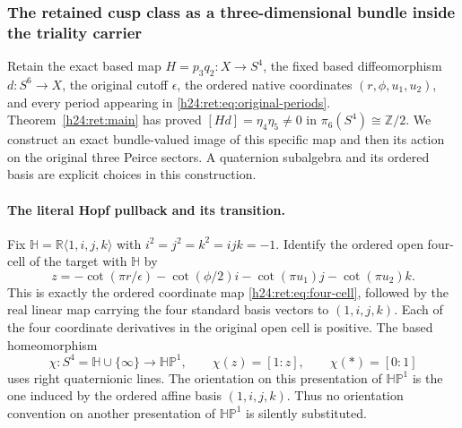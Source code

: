 
\subsubsection{The retained cusp class as a three-dimensional bundle inside the triality carrier}
\label{h24:rettri:section}

Retain the exact based map $H=p_3q_2:X\to S^4$, the fixed based
diffeomorphism $d:S^6\to X$, the original cutoff $\epsilon$, the ordered
native coordinates $(r,\phi,u_1,u_2)$, and every period appearing in
\eqref{h24:ret:eq:original-periods}. Theorem~\ref{h24:ret:main} has proved
$[H d]=\eta_4\eta_5\ne0$ in $\pi_6(S^4)\cong\mathbb Z/2$.
We construct an exact bundle-valued image of this specific map and then
its action on the original three Peirce sectors. A quaternion subalgebra
and its ordered basis are explicit choices in this construction.

\paragraph{The literal Hopf pullback and its transition.}
Fix $\mathbb H=\mathbb R\langle1,i,j,k\rangle$ with
$i^2=j^2=k^2=ijk=-1$. Identify the ordered open four-cell of the target
with $\mathbb H$ by
\begin{equation}
 z=-\cot(\pi r/\epsilon)-\cot(\phi/2)i
       -\cot(\pi u_1)j-\cot(\pi u_2)k.
 \label{h24:rettri:z}
\end{equation}
This is exactly the ordered coordinate map
\eqref{h24:ret:eq:four-cell}, followed by the real linear map carrying
the four standard basis vectors to $(1,i,j,k)$. Each of the four
coordinate derivatives in the original open cell is positive.
The based homeomorphism
\begin{equation}
 \chi:S^4=\mathbb H\cup\{\infty\}\longrightarrow\mathbb H\mathbb P^1,
 \qquad \chi(z)=[1:z],\qquad \chi(*)=[0:1]
 \label{h24:rettri:chi}
\end{equation}
uses right quaternionic lines. The orientation on this presentation of
$\mathbb H\mathbb P^1$ is the one induced by the ordered affine basis
$(1,i,j,k)$. Thus no orientation convention on another presentation of
$\mathbb H\mathbb P^1$ is silently substituted.


